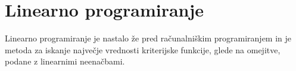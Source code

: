 \documentclass[10pt,a4paper,oneside]{book}
\begin{document}
\section{Linearno programiranje}
Linearno programiranje je nastalo že pred računalniškim programiranjem in je metoda za iskanje največje vrednosti kriterijske funkcije, glede na omejitve, podane z linearnimi neenačbami.\\

\end{document}

